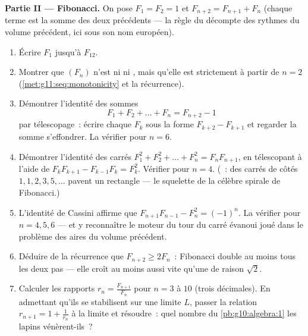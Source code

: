 \begin{problem}
\medskip
\noindent\textbf{Partie II --- Fibonacci.}
On pose $F_1 = F_2 = 1$ et $F_{n+2} = F_{n+1} + F_n$ (chaque terme
est la somme des deux précédents --- la règle du décompte des
rythmes du volume précédent, ici sous son nom européen).
\begin{enumerate}[resume]
  \item Écrire $F_1$ jusqu'à $F_{12}$.
  \item Montrer que $(F_n)$ n'est ni  ni ,
        mais qu'elle est strictement  à partir de $n = 2$
        (\cref{met:g11:seq:monotonicity} et la récurrence).
  \item Démontrer l'identité des sommes
        \[
        F_1 + F_2 + \dots + F_n = F_{n+2} - 1
        \]
        par télescopage~: écrire chaque $F_k$ sous la forme
        $F_{k+2} - F_{k+1}$ et regarder la somme s'effondrer. La
        vérifier pour $n = 6$.
  \item Démontrer l'identité des carrés
        $F_1^2 + F_2^2 + \dots + F_n^2 = F_n F_{n+1}$, en
        télescopant à l'aide de
        $F_k F_{k+1} - F_{k-1} F_k = F_k^2$. Vérifier pour $n = 4$.
        (~: des carrés de côtés $1, 1, 2, 3, 5, \dots$ pavent
        un rectangle --- le squelette de la célèbre spirale de
        Fibonacci.)
  \item L'identité de Cassini affirme que
        $F_{n+1} F_{n-1} - F_n^2 = (-1)^n$. La vérifier pour
        $n = 4, 5, 6$ --- et y reconnaître le moteur du tour du
        carré évanoui joué dans le problème des aires du volume
        précédent.
  \item Déduire de la récurrence que $F_{n+2} \geq 2 F_n$~:
        Fibonacci double au moins tous les deux pas --- elle croît
        au moins aussi vite qu'une  de raison
        $\sqrt2$.
  \item Calculer les rapports $r_n = \frac{F_{n+1}}{F_n}$ pour
        $n = 3$ à $10$ (trois décimales). En admettant qu'ils se
        stabilisent sur une limite $L$, passer la relation
        $r_{n+1} = 1 + \frac{1}{r_n}$ à la limite et résoudre~:
        quel nombre du \cref{pb:g10:algebra:1} les lapins
        vénèrent-ils~?
\end{enumerate}


\end{problem}
